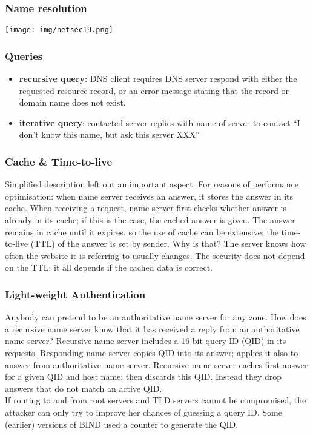 \documentclass[a4paper, 10pt, titlepage]{article}
\begin{document}
\subsubsection*{Name resolution}
\begin{center}
	\texttt{[image: img/netsec19.png]}
\end{center}

\subsubsection*{Queries}
\begin{itemize}
	\item \textbf{recursive query}: DNS client requires DNS server respond with either the requested resource 	record, or an error message stating that the record or domain name does not exist.
	\item \textbf{iterative query}: contacted server replies with name of server to contact “I don’t know this 	name, but ask this server XXX”
\end{itemize}

\subsubsection*{Cache \& Time-to-live}
Simplified description left out an important aspect. For reasons of performance optimisation: when name server receives an answer, it stores the answer in its cache. When receiving a request, name server first checks whether answer is already in its cache; if this is the case, the cached answer is given.
The answer remains in cache until it expires, so the use of cache can be extensive; the time-to-live (TTL) of the answer is set by sender.
Why is that? The server knows how often the website it is referring to usually changes. %
The security does not depend on the TTL: it all depends if the cached data is correct.

\subsubsection*{Light-weight Authentication}
Anybody can pretend to be an authoritative name server for any zone. How does a recursive name server know that it has received a reply from an authoritative name server? Recursive name server includes a 16-bit query ID (QID) in its requests. Responding name server copies QID into its answer; applies it also to answer from authoritative name server. Recursive name server caches first answer for a given QID and host name; then discards this QID. Instead they drop answers that do not match an active QID. \medskip\\
If routing to and from root servers and TLD servers cannot be compromised, the attacker can only try to improve her chances of guessing a query ID. Some (earlier) versions of BIND used a counter to generate the QID.
\end{document}
